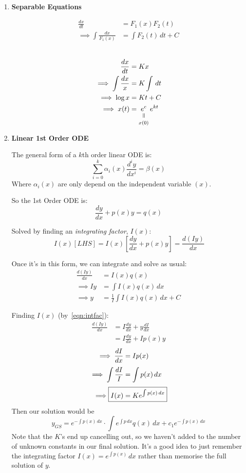 \documentclass[10pt]{scrartcl}
\begin{document}
\begin{enumerate}[(1)]
\item \textbf{Separable Equations}

\[
\begin{aligned}
  \frac{dx}{dt} &= F_1(x)F_2(t)\\
  \implies \int \frac{dx}{F_1(x)} &= \int F_2(t)\,dt + C
\end{aligned}
\]~

\begin{example}
\[
\begin{aligned}
  \frac{dx}{dt} &= Kx\\
  \implies \int \frac{dx}{x} &= K\int\, dt\\
  \implies \log x &= Kt + C\\
  \implies x(t) &= \equalto{e^c}{x(0)}\,e^{kt}
\end{aligned}
\]
\end{example}

\item \textbf{Linear 1st Order ODE}

The general form of a $k$th order linear ODE is: 
\[\sum_{i=0}^k \alpha_i(x) \frac{d^iy}{dx^i} = \beta (x)\]
Where $\alpha_i(x)$ are only depend on the independent variable $(x)$. 

So the 1st Order ODE is: 
\[\frac{dy}{dx} + p(x)y = q(x)\]

Solved by finding an \emph{integrating factor}, $I(x)$:
\begin{equation}
\label{eqn:intfac}\ I(x)[LHS] = I(x)\left[\frac{dy}{dx} + p(x)y\right] = \frac{d(Iy)}{dx}
\end{equation}

Once it's in this form, we can integrate and solve as usual: 
\[
\begin{aligned}
  \frac{d(Iy)}{dx} &= I(x)q(x)\\
  \implies Iy &= \int I(x)q(x)\,dx\\
  \implies y &= \frac{1}{I} \int I(x)q(x)\,dx + C
\end{aligned}
\]

Finding $I(x)$ (by~\ref{eqn:intfac}): 
\begin{align*}
    \frac{d(Iy)}{dx} &= I\frac{dy}{dx} + y\frac{dI}{dx}\\
    &= I\frac{dy}{dx} + Ip(x)y
\end{align*}
\[
\begin{aligned}
 \implies  \frac{dI}{dx} &= Ip(x)\\[.1cm]
  \implies \int \frac{dI}{I} &= \int p(x)\,dx\\[.1cm]
  \implies \Aboxed{I(x) &= Ke^{\int p(x)\,dx}}
\end{aligned}
\]
Then our solution would be
\[y_{GS} = e^{-\int p(x)\,dx}\cdot \int e^{\int p\,dx}q(x)\,dx + c_1 e^{-\int p(x)\,dx}\]
Note that the $K$'s end up cancelling out, so we haven't added to the number of unknown constants in our final solution. It's a good idea to just remember the integrating factor $I(x) = e^{\int p(x)}\,dx$ rather than memorise the full solution of $y$. 


\end{enumerate}
\end{document}
